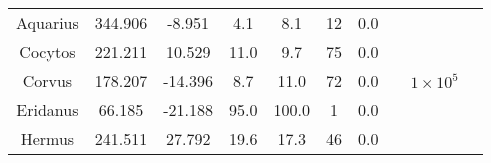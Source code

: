 \begin{table}
\begin{tabular}{cSSSSSSccc}
Aquarius & 344.906 & -8.951 & 4.1 & 8.1 & 12 & 0.0 & \citet{williams:2011} & &  \\
Cocytos & 221.211 & 10.529 & 11.0 & 9.7 & 75 & 0.0 & \citet{grillmair:2009} & &  \\
Corvus & 178.207 & -14.396 & 8.7 & 11.0 & 72 & 0.0 & \citet{mateu:2018} & $1 \times 10^{5}$ & \citet{mateu:2018} \\
Eridanus & 66.185 & -21.188 & 95.0 & 100.0 & 1 & 0.0 & \citet{myeong:2017} & &  \\
Hermus & 241.511 & 27.792 & 19.6 & 17.3 & 46 & 0.0 & \citet{grillmair:2014} & &  \\
\hline \hline
\end{tabular}
\end{table}
